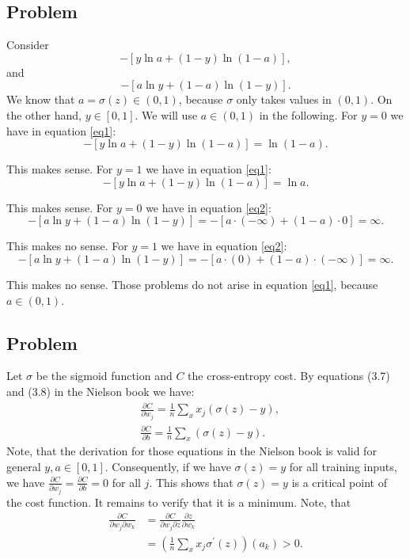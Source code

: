 \documentclass{article}
\begin{document}
\subsection{Problem}
Consider 
\begin{equation}
\label{eq1}
	-[y \ln a+(1-y) \ln (1-a)],
\end{equation}
and
\begin{equation}
\label{eq2}
	-[a \ln y+(1-a) \ln (1-y)].
\end{equation}
We know that $a=\sigma(z)\in (0,1)$, because $\sigma$ only takes values in $(0,1)$. On the other hand, $y\in [0,1]$. We will use $a\in (0,1)$ in the following.
For $y= 0$ we have in equation \eqref{eq1}:
\begin{equation*}
	-[y \ln a+(1-y) \ln (1-a)]=\ln (1-a).
\end{equation*}

This makes sense. For $y= 1$ we have in equation \eqref{eq1}:
\begin{equation*}
	-[y \ln a+(1-y) \ln (1-a)]=\ln a.
\end{equation*}

This makes sense. For $y= 0$ we have in equation \eqref{eq2}:
\begin{equation*}
	-[a \ln y+(1-a) \ln (1-y)]= -[a \cdot (-\infty) +(1-a) \cdot 0]=\infty.
\end{equation*}

This makes no sense. For $y= 1$ we have in equation \eqref{eq2}:
\begin{equation*}
	-[a \ln y+(1-a) \ln (1-y)]= -[a \cdot (0) +(1-a) \cdot (-\infty)]=\infty.
\end{equation*}

This makes no sense. Those problems do not arise in equation \eqref{eq1}, because $a\in (0,1)$.

\subsection{Problem}
Let $\sigma$ be the sigmoid function and $C$ the cross-entropy cost. By equations (3.7) and (3.8) in the Nielson book we have:
$$
\begin{aligned}
	&\frac{\partial C}{\partial w_j}=\frac{1}{n} \sum_x x_j(\sigma(z)-y),
	\\&\frac{\partial C}{\partial b}=\frac{1}{n} \sum_x(\sigma(z)-y).
\end{aligned}
$$
Note, that the derivation for those equations in the Nielson book is valid for general $y,a\in [0,1]$. Consequently, if we have $\sigma(z)=y$ for all training inputs, we have $\frac{\partial C}{\partial w_j}=\frac{\partial C}{\partial b}=0$ for all $j$. This shows that $\sigma(z)=y$ is a critical point of the cost function. It remains to verify that it is a minimum. Note, that
$$
\begin{aligned}
	\frac{\partial C}{\partial w_j\partial w_k}&=\frac{\partial C}{\partial w_j\partial z}\frac{\partial z}{\partial w_k}
	\\&=\left(\frac{1}{n} \sum_x x_j\sigma^{\prime}(z)\right)\left(a_k\right)>0.
\end{aligned}
$$
\end{document}
